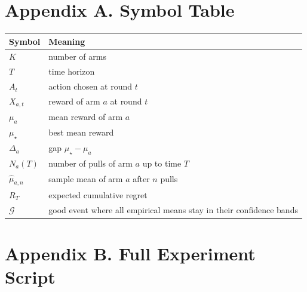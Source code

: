 \documentclass[en,nofont,11pt]{elegantbook}
\begin{document}
\chapter*{Appendix A. Symbol Table}

\begin{table}[H]
\centering
\begin{tabular}{ll}
\toprule
Symbol & Meaning\\
\midrule
$K$ & number of arms\\
$T$ & time horizon\\
$A_t$ & action chosen at round $t$\\
$X_{a,t}$ & reward of arm $a$ at round $t$\\
$\mu_a$ & mean reward of arm $a$\\
$\mu_\star$ & best mean reward\\
$\Delta_a$ & gap $\mu_\star-\mu_a$\\
$N_a(T)$ & number of pulls of arm $a$ up to time $T$\\
$\widehat{\mu}_{a,n}$ & sample mean of arm $a$ after $n$ pulls\\
$R_T$ & expected cumulative regret\\
$\mathcal{G}$ & good event where all empirical means stay in their confidence bands\\
\bottomrule
\end{tabular}
\end{table}

\chapter*{Appendix B. Full Experiment Script}



\backmatter
\nocite{lattimore2020bandit,bubeck2012,auer2002,russo2018,srinivas2010gpucb}
\printbibliography[heading=bibintoc,title={References}]
\end{document}
